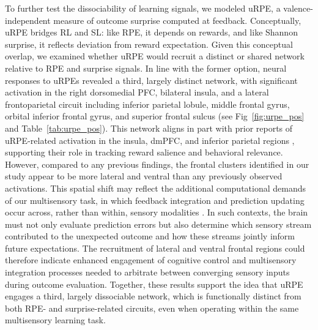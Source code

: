 \documentclass{article}
\begin{document}
To further test the dissociability of learning signals, we modeled uRPE, a valence-independent measure of outcome surprise computed at feedback. Conceptually, uRPE bridges RL and SL: like RPE, it depends on rewards, and like Shannon surprise, it reflects deviation from reward expectation. Given this conceptual overlap, we examined whether uRPE would recruit a distinct or shared network relative to RPE and surprise signals. In line with the former option, neural responses to uRPEs revealed a third, largely distinct network, with significant activation in the right dorsomedial PFC, bilateral insula, and a lateral frontoparietal circuit including inferior parietal lobule, middle frontal gyrus, orbital inferior frontal gyrus, and superior frontal sulcus (see Fig~\ref{fig:urpe_pos} and Table~\ref{tab:urpe_pos}). This network aligns in part with prior reports of uRPE-related activation in the insula, dmPFC, and inferior parietal regions \cite{corlett2022meta, fouragnan2018separate}, supporting their role in tracking reward salience and behavioral relevance. However, compared to any previous findings, the frontal clusters identified in our study appear to be more lateral and ventral than any previously observed activations. This spatial shift may reflect the additional computational demands of our multisensory task, in which feedback integration and prediction updating occur across, rather than within, sensory modalities \cite{driver2008multisensory}. In such contexts, the brain must not only evaluate prediction errors but also determine which sensory stream contributed to the unexpected outcome and how these streams jointly inform future expectations. The recruitment of lateral and ventral frontal regions could therefore indicate enhanced engagement of cognitive control \cite{rushworth2004action} and multisensory integration processes \cite{noppeney2010perceptual} needed to arbitrate between converging sensory inputs during outcome evaluation. Together, these results support the idea that uRPE engages a third, largely dissociable network, which is functionally distinct from both RPE- and surprise-related circuits, even when operating within the same multisensory learning task.\newline
\end{document}
